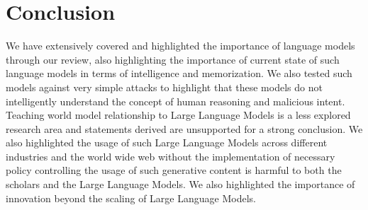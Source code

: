 \documentclass[pdflatex,sn-mathphys-num]{sn-jnl}%
\theoremstyle{thmstyleone}%
\theoremstyle{thmstyletwo}%
\theoremstyle{thmstylethree}%
\begin{document}
\section{Conclusion}
We have extensively covered and highlighted the importance of language models through our review, also highlighting the importance of current state of such language models in terms of intelligence and memorization. We also tested such models against very simple attacks to highlight that these models do not intelligently understand the concept of human reasoning and malicious intent. Teaching world model relationship to Large Language Models is a less explored research area and statements derived are unsupported for a strong conclusion. We also highlighted the usage of such Large Language Models across different industries and the world wide web without the implementation of necessary policy controlling the usage of such generative content is harmful to both the scholars and the Large Language Models. We also highlighted the importance of innovation beyond the scaling of Large Language Models.
\end{document}
